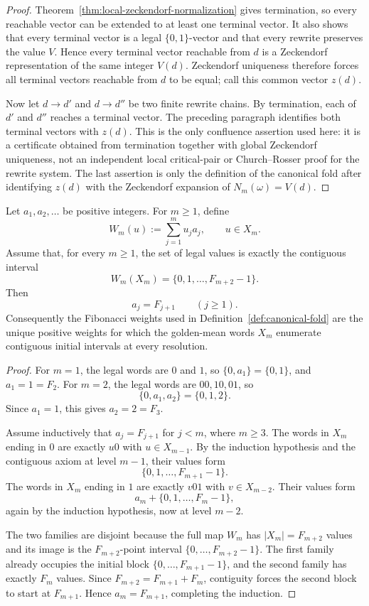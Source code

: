 \begin{proof}
Theorem~\ref{thm:local-zeckendorf-normalization} gives termination, so every
reachable vector can be extended to at least one terminal vector.  It also
shows that every terminal vector is a legal \(\{0,1\}\)-vector and that every
rewrite preserves the value \(V\).  Hence every terminal vector reachable from
\(d\) is a Zeckendorf representation of the same integer \(V(d)\).
Zeckendorf uniqueness \cite{Zeckendorf1972} therefore forces all terminal
vectors reachable from \(d\) to be equal; call this common vector \(z(d)\).

Now let \(d\to d'\) and \(d\to d''\) be two finite rewrite chains.  By
termination, each of \(d'\) and \(d''\) reaches a terminal vector.  The
preceding paragraph identifies both terminal vectors with \(z(d)\).  This is
the only confluence assertion used here: it is a certificate obtained from
termination together with global Zeckendorf uniqueness, not an independent
local critical-pair or Church--Rosser proof for the rewrite system.  The last
assertion is only the definition of the canonical fold after identifying
\(z(d)\) with the Zeckendorf expansion of \(N_m(\omega)=V(d)\).
\end{proof}

\begin{theorem}\label{thm:contiguous-fibonacci-uniqueness}
Let \(a_1,a_2,\dots\) be positive integers.  For \(m\ge1\), define
\[
W_m(u):=\sum_{j=1}^m u_ja_j,\qquad u\in X_m.
\]
Assume that, for every \(m\ge1\), the set of legal values is exactly the
contiguous interval
\[
W_m(X_m)=\{0,1,\dots,F_{m+2}-1\}.
\]
Then
\[
a_j=F_{j+1}\qquad (j\ge1).
\]
Consequently the Fibonacci weights used in Definition~\ref{def:canonical-fold}
are the unique positive weights for which the golden-mean words \(X_m\)
enumerate contiguous initial intervals at every resolution.
\end{theorem}

\begin{proof}
For \(m=1\), the legal words are \(0\) and \(1\), so
\(\{0,a_1\}=\{0,1\}\), and \(a_1=1=F_2\).  For \(m=2\), the legal words are
\(00,10,01\), so
\[
\{0,a_1,a_2\}=\{0,1,2\}.
\]
Since \(a_1=1\), this gives \(a_2=2=F_3\).

Assume inductively that \(a_j=F_{j+1}\) for \(j<m\), where \(m\ge3\).  The
words in \(X_m\) ending in \(0\) are exactly \(u0\) with \(u\in X_{m-1}\).
By the induction hypothesis and the contiguous axiom at level \(m-1\), their
values form
\[
\{0,1,\dots,F_{m+1}-1\}.
\]
The words in \(X_m\) ending in \(1\) are exactly \(v01\) with
\(v\in X_{m-2}\).  Their values form
\[
a_m+\{0,1,\dots,F_m-1\},
\]
again by the induction hypothesis, now at level \(m-2\).

The two families are disjoint because the full map \(W_m\) has
\(|X_m|=F_{m+2}\) values and its image is the \(F_{m+2}\)-point interval
\(\{0,\dots,F_{m+2}-1\}\).  The first family already occupies the initial
block \(\{0,\dots,F_{m+1}-1\}\), and the second family has exactly \(F_m\)
values.  Since \(F_{m+2}=F_{m+1}+F_m\), contiguity forces the second block to
start at \(F_{m+1}\).  Hence \(a_m=F_{m+1}\), completing the induction.
\end{proof}

